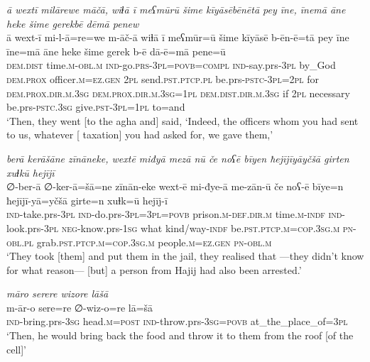 \ea \label{BP.124}
\textit{ā wextī milārewe māčā, wiɫā ī meʕmūrū šime kīyāsēbēnētā pey īne, īnemā āne heke šime gerekbē dēmā penew} \\ 
\gll ā wext-ī mi-l-ā=re=we m-āč-ā wiɫā ī meʕmūr=ū šime kīyāsē b-ēn-ē=tā pey īne īne=mā āne heke šime gerek b-ē dā-ē=mā pene=ū \\ 
 \textsc{dem.dist} time\textsc{.m}\textsc{-obl}\textsc{.m} \textsc{ind-}go.\textsc{prs}\textsc{-3pl}\textsc{=\textsc{povb}}\textsc{=compl} \textsc{ind-}say.prs\textsc{-3pl} by\_God \textsc{dem.prox} officer\textsc{.m}\textsc{=ez.gen} \textsc{2pl} send\textsc{.pst}\textsc{.ptcp}\textsc{.pl} be.prs\textsc{-pstc}\textsc{-3pl}=\textsc{2pl} for \textsc{dem.prox}\textsc{.dir}\textsc{.m}\textsc{.3sg} \textsc{dem.prox}\textsc{.dir}\textsc{.m}\textsc{.3sg}\textsc{=\textsc{1pl}} \textsc{dem.dist}\textsc{.dir}\textsc{.m}\textsc{.3sg} if \textsc{2pl} necessary be.prs\textsc{-pstc}\textsc{.3sg} give\textsc{.pst}\textsc{-3pl}\textsc{=\textsc{1pl}} to=and \\ 
\glt `Then, they went [to the agha and] said, ‘Indeed, the officers whom you had sent to us, whatever [ taxation] you had asked for, we gave them,'
\z 
 
\ea \label{BP.139}
\textit{berā kerāšāne zīnāneke, wextē miđyā mezā nū če noʕē bīyen ħejījīyāyčšā girten xuɫkū hejījī} \\ 
\gll ∅-ber-ā ∅-ker-ā=šā=ne zīnān-eke wext-ē mi-đye-ā me-zān-ū če noʕ-ē bīye=n ħejījī-yā=yčšā girte=n xuɫk=ū hejīj-ī \\ 
 \textsc{ind-}take.prs\textsc{-3pl} \textsc{ind-}do.prs\textsc{-3pl}\textsc{=3pl}\textsc{=\textsc{povb}} prison\textsc{.m}\textsc{-def}\textsc{.dir}\textsc{.m} time\textsc{.m}\textsc{-indf} \textsc{ind-}look.prs\textsc{-3pl} \textsc{neg-}know.prs\textsc{-\textsc{1sg}} what kind/way\textsc{-indf} be\textsc{.pst}\textsc{.ptcp}\textsc{.m}\textsc{=cop}\textsc{.3sg}\textsc{.m} \textsc{pn}\textsc{-obl}\textsc{.pl} grab\textsc{.pst}\textsc{.ptcp}\textsc{.m}\textsc{=cop}\textsc{.3sg}\textsc{.m} people\textsc{.m}\textsc{=ez.gen} \textsc{pn}\textsc{-obl}\textsc{.m} \\ 
\glt `They took [them] and put them in the jail, they realised that —they didn’t know for what reason— [but] a person from Hajij had also been arrested.'
\z 
 
\ea \label{BP.145}
\textit{māro serere wizore lāšā} \\ 
\gll m-ār-o sere=re ∅-wiz-o=re lā=šā \\ 
 \textsc{ind-}bring.prs\textsc{-3sg} head\textsc{.m}\textsc{=\textsc{post}} \textsc{ind-}throw.prs\textsc{-3sg}\textsc{=\textsc{povb}} at\_the\_place\_of\textsc{=3pl} \\ 
\glt `Then, he would bring back the food and throw it to them from the roof [of the cell]'
\z 
 
